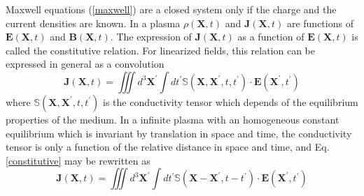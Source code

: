 \documentclass[a4paper,12pt]{article}%
\begin{document}
Maxwell equations (\ref{maxwell}) are a closed system only if the charge and
the current densities are known. In a plasma $\rho\left(  \mathbf{X},t\right)
$ and $\mathbf{J}\left(  \mathbf{X},t\right)  $ are functions of
$\mathbf{E}\left(  \mathbf{X},t\right)  $ and $\mathbf{B}\left(
\mathbf{X},t\right)  $. The expression of $\mathbf{J}\left(  \mathbf{X}%
,t\right)  $ as a function of $\mathbf{E}\left(  \mathbf{X},t\right)  $ is
called the constitutive relation. For linearized fields, this relation can be
expressed in general as a convolution%
\begin{equation}
\mathbf{J}\left(  \mathbf{X},t\right)  =%
{\displaystyle\iiint}
d^{3}\mathbf{X}^{\prime}\int dt^{\prime}\mathbb{S}\left(  \mathbf{X}%
,\mathbf{X}^{\prime},t,t^{\prime}\right)  \cdot\mathbf{E}\left(
\mathbf{X}^{\prime},t^{\prime}\right)  \label{constitutive}%
\end{equation}
where $\mathbb{S}\left(  \mathbf{X},\mathbf{X}^{\prime},t,t^{\prime}\right)  $
is the conductivity tensor which depends of the equilibrium properties of the
medium. In a infinite plasma with an homogeneous constant equilibrium which is
invariant by translation in space and time, the conductivity tensor is only a
function of the relative distance in space and time, and Eq.
\ref{constitutive} may be rewritten as%
\begin{equation}
\mathbf{J}\left(  \mathbf{X},t\right)  =%
{\displaystyle\iiint}
d^{3}\mathbf{X}^{\prime}\int dt^{\prime}\mathbb{S}\left(  \mathbf{X}%
-\mathbf{X}^{\prime},t-t^{\prime}\right)  \cdot\mathbf{E}\left(
\mathbf{X}^{\prime},t^{\prime}\right)  \label{constitutive2}%
\end{equation}
\end{document}

